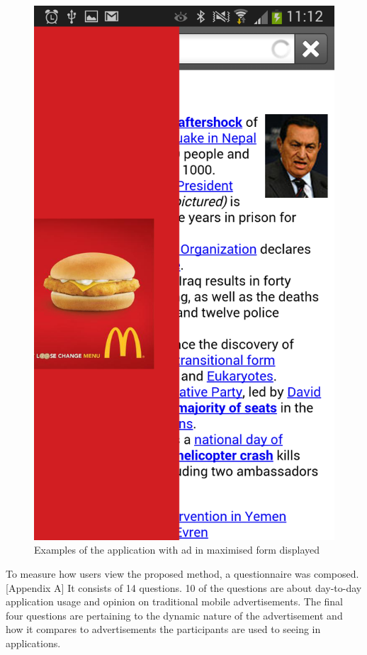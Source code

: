 \begin{figure}
\begin{center}
\includegraphics[scale=0.25]{Images/gesturead_big2.png}
\caption{Examples of the application with ad in maximised form displayed}
\end{center}
\end{figure}

To measure how users view the proposed method, a questionnaire was composed. [Appendix A] It consists of 14 questions. 10 of the questions are about day-to-day application usage and opinion on traditional mobile advertisements. The final four questions are pertaining to the dynamic nature of the advertisement and how it compares to advertisements the participants are used to seeing in applications.

